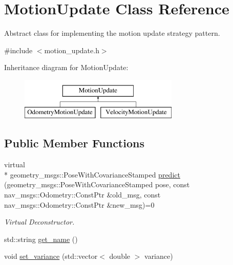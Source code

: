 \hypertarget{classMotionUpdate}{\section{Motion\-Update Class Reference}
\label{classMotionUpdate}
}


Abstract class for implementing the motion update strategy pattern.  




{\ttfamily \#include $<$motion\-\_\-update.\-h$>$}

Inheritance diagram for Motion\-Update\-:\begin{figure}[H]
\begin{center}
\leavevmode
\includegraphics[height=2.000000cm]{classMotionUpdate}
\end{center}
\end{figure}
\subsection*{Public Member Functions}
\begin{DoxyCompactItemize}
\item 
virtual \\*
geometry\-\_\-msgs\-::\-Pose\-With\-Covariance\-Stamped \hyperlink{classMotionUpdate_a86e028d43981218ddf6e354e8f201e75}{predict} (geometry\-\_\-msgs\-::\-Pose\-With\-Covariance\-Stamped pose, const nav\-\_\-msgs\-::\-Odometry\-::\-Const\-Ptr \&old\-\_\-msg, const nav\-\_\-msgs\-::\-Odometry\-::\-Const\-Ptr \&new\-\_\-msg)=0
\begin{DoxyCompactList}\small\item\em Virtual Deconstructor. \end{DoxyCompactList}\item 
std\-::string \hyperlink{classMotionUpdate_aaf0a65c8acbc92f8f199e874f596db13}{get\-\_\-name} ()
\item 
void \hyperlink{classMotionUpdate_a26584d87c8360faedc8522bd163da49b}{set\-\_\-variance} (std\-::vector$<$ double $>$ variance)
\end{DoxyCompactItemize}
